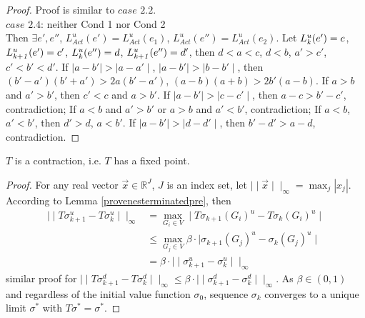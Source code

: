 \documentclass[10pt, conference, compsocconf]{IEEEtran}
\begin{document}
\begin{proof}
Proof is similar to \textbf{$\textit{case 2.2}$}.\\
\textbf{$\textit{case 2.4}$}: neither Cond 1 nor Cond 2\\
Then $\exists e', e''$, $L_{Act}^u(e')=L_{Act}^u(e_{1})$, $L_{Act}^u(e'')=L_{Act}^u(e_{2})$. Let $L^u_{\it k}(e')=c$, $L^u_{\it k+1}(e')=c'$, $L^u_{\it k}(e'')=d$, $L^u_{\it k+1}(e'')=d'$, then $d<a<c$, $d<b$, $a'>c'$, $c'<b'<d'$. If $\mid a-b'\mid >\mid a-a'\mid$, $\mid a-b' \mid>\mid b-b'\mid$, then $(b'-a')(b'+a')>2a(b'-a')$, $(a-b)(a+b)>2b'(a-b)$. If $a>b$ and $a'>b'$, then $c'<c$ and $a>b'$. If $\mid a-b'\mid >\mid c-c'\mid$, then $a-c>b'-c'$, contradiction; If $a<b$ and $a'>b'$ or $a>b$ and $a'<b'$, contradiction; If $a<b$, $a'<b'$, then $d'>d$, $a<b'$. If $\mid a-b'\mid >\mid d-d'\mid$, then $b'-d'>a-d$, contradiction.
\end{proof}

\begin{Lemma}
\label{provenesterminated}
$T$ is a contraction, i.e. $T$ has a fixed point.
\end{Lemma}
\begin{proof}
For any real vector $\overrightarrow{x}\in \mathds{R}^J$, $J$ is an index set, let $\mid \mid \overrightarrow{x}\mid\mid_{\infty}=\max_{j}|x_{j}|$. According to Lemma \ref{provenesterminatedpre}, then
\begin{align*}
\mid\mid T\sigma_{k+1}^u-T\sigma_{k}^u\mid\mid_{\infty}&=\underset{G_{i}\in V}{\max}\mid T\sigma_{k+1}(G_{i})^u-T\sigma_{k}(G_{i})^u \mid\\
&\leq\underset{G_{j}\in V}{\max}\beta\cdot \mid   \sigma_{k+1}(G_{\textit{j}})^u-\sigma_{k}(G_{\textit{j}})^u \mid\\
&=\beta\cdot\mid\mid \sigma_{k+1}^u-\sigma_{k}^u\mid\mid_{\infty}
\end{align*}
similar proof for $\mid\mid T\sigma_{k+1}^d-T\sigma_{k}^d\mid\mid_{\infty}\leq\beta\cdot\mid\mid \sigma_{k+1}^d-\sigma_{k}^d\mid\mid_{\infty}$. As $\beta\in (0,1)$ and regardless of the initial value function $\sigma_{0}$, sequence $\sigma_{k}$ converges to a unique limit $\sigma^*$ with $T\sigma^*=\sigma^*$.
\end{proof}
\end{document}
